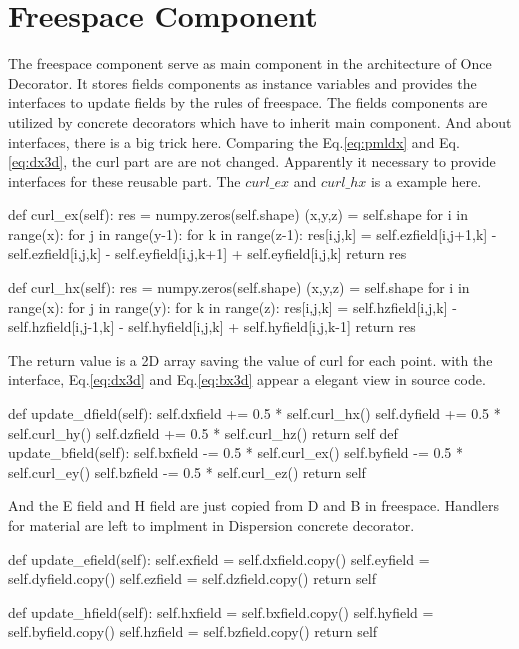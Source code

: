 \section{Freespace Component}
The freespace component serve as main component in the architecture of Once Decorator. It stores fields components as
instance variables and provides the interfaces to update fields by the rules of freespace. The fields components are
utilized by concrete decorators which have to inherit main component. And about interfaces, there is a big trick
here. Comparing the Eq.\ref{eq:pmldx} and Eq.\ref{eq:dx3d}, the curl part are are not changed. Apparently it necessary
to provide interfaces for these reusable part. The $curl\_ex$ and $curl\_hx$ is a example here.
\begin{code}
    def curl_ex(self):
        res = numpy.zeros(self.shape)
        (x,y,z) = self.shape
        for i in range(x):
            for j in range(y-1):
                for k in range(z-1):
                    res[i,j,k] = self.ezfield[i,j+1,k] - self.ezfield[i,j,k] 
                               - self.eyfield[i,j,k+1] + self.eyfield[i,j,k]
        return res

    def curl_hx(self):
        res = numpy.zeros(self.shape)
        (x,y,z) = self.shape
        for i in range(x):
            for j in range(y):
                for k in range(z):
                    res[i,j,k] = self.hzfield[i,j,k] - self.hzfield[i,j-1,k] 
                               - self.hyfield[i,j,k] + self.hyfield[i,j,k-1]
        return res
\end{code}
The return value is a 2D array saving the value of curl for each point. with the interface, Eq.\ref{eq:dx3d} and
Eq.\ref{eq:bx3d} appear a elegant view in source code.
\begin{code}
    def update_dfield(self):
        self.dxfield += 0.5 * self.curl_hx()
        self.dyfield += 0.5 * self.curl_hy()
        self.dzfield += 0.5 * self.curl_hz()
        return self
    def update_bfield(self):
        self.bxfield -= 0.5 * self.curl_ex()
        self.byfield -= 0.5 * self.curl_ey()
        self.bzfield -= 0.5 * self.curl_ez()
        return self
\end{code}
And the E field and H field are just copied from D and B in freespace. Handlers for material are left to implment in
Dispersion concrete decorator. 
\begin{code}
    def update_efield(self):
        self.exfield = self.dxfield.copy()
        self.eyfield = self.dyfield.copy()
        self.ezfield = self.dzfield.copy()
        return self

    def update_hfield(self):
        self.hxfield = self.bxfield.copy()
        self.hyfield = self.byfield.copy()
        self.hzfield = self.bzfield.copy()
        return self
\end{code}



